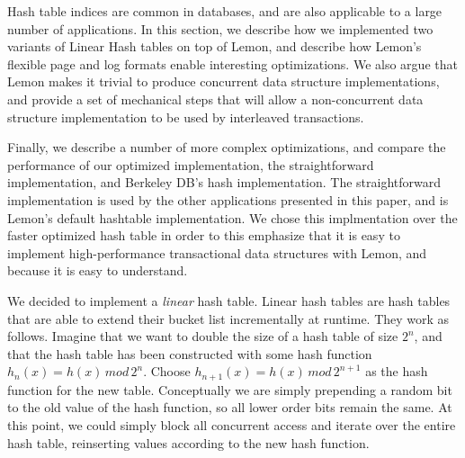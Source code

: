 \documentclass[letterpaper,twocolumn,english]{article}
\newcommand{\yad}{Lemon\xspace}
\begin{document}

%

Hash table indices are common in databases, and are also applicable to
a large number of applications.  In this section, we describe how we
implemented two variants of Linear Hash tables on top of \yad, and
describe how \yad's flexible page and log formats enable interesting
optimizations.  We also argue that \yad makes it trivial to produce
concurrent data structure implementations, and provide a set of
mechanical steps that will allow a non-concurrent data structure
implementation to be used by interleaved transactions.

Finally, we describe a number of more complex optimizations, and
compare the performance of our optimized implementation, the
straightforward implementation, and Berkeley DB's hash implementation.
The straightforward implementation is used by the other applications
presented in this paper, and is \yad's default hashtable
implementation.  We chose this implmentation over the faster optimized
hash table in order to this emphasize that it is easy to implement
high-performance transactional data structures with \yad, and because
it is easy to understand.

We decided to implement a {\em linear} hash table.  Linear hash tables are
hash tables that are able to extend their bucket list incrementally at
runtime. They work as follows. Imagine that we want to double the size
of a hash table of size $2^{n}$, and that the hash table has been
constructed with some hash function $h_{n}(x)=h(x)\, mod\,2^{n}$.
Choose $h_{n+1}(x)=h(x)\, mod\,2^{n+1}$ as the hash function for the
new table. Conceptually we are simply prepending a random bit to the
old value of the hash function, so all lower order bits remain the
same. At this point, we could simply block all concurrent access and
iterate over the entire hash table, reinserting values according to
the new hash function.
\end{document}

